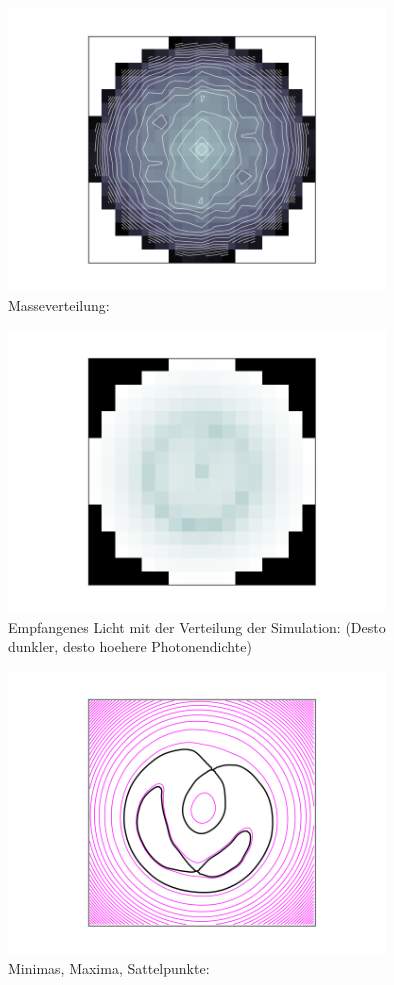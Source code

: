 \documentclass[pdftex,12pt,a4paper]{article}
\begin{document}
\begin{figure}[position=h]
\centering
 \caption{Masseverteilung:}
 \includegraphics[width=10cm]{Bilder/workoutput3}%
\end{figure}

\begin{figure}[position=h]
\centering
 \caption{Empfangenes Licht mit der Verteilung der Simulation:\newline
  (Desto dunkler, desto hoehere Photonendichte)}
 \includegraphics[width=10cm]{Bilder/workoutput2}%
\end{figure}

\begin{figure}[position=h]
\centering
 \caption{Minimas, Maxima, Sattelpunkte:}
 \includegraphics[width=10cm]{Bilder/workoutput1}%
\end{figure}
\end{document}
